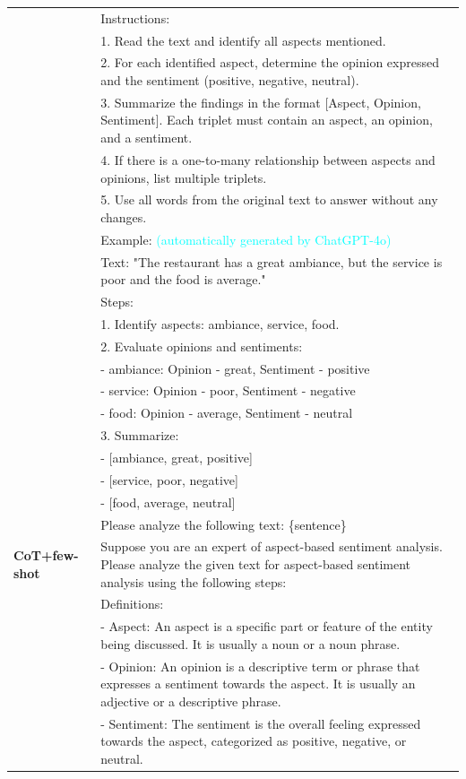\documentclass[11pt]{article}
\begin{document}
\begin{table}
{\begin{tabular}{lp{40em}}
    &Instructions:\\
    &1. Read the text and identify all aspects mentioned.\\
    &2. For each identified aspect, determine the opinion expressed and the sentiment (positive, negative, neutral).\\
    &3. Summarize the findings in the format [Aspect, Opinion, Sentiment]. Each triplet must contain an aspect, an opinion, and a sentiment.\\
    &4. If there is a one-to-many relationship between aspects and opinions, list multiple triplets.\\
    &5. Use all words from the original text to answer without any changes.\\
    
    &Example: \textcolor{cyan}{(automatically generated by ChatGPT-4o)}\\
    &Text: "The restaurant has a great ambiance, but the service is poor and the food is average."\\
    
    &Steps:\\
    &1. Identify aspects: ambiance, service, food.\\
    &2. Evaluate opinions and sentiments:\\
    &    - ambiance: Opinion - great, Sentiment - positive\\
    &    - service: Opinion - poor, Sentiment - negative\\
    &    - food: Opinion - average, Sentiment - neutral\\
    &3. Summarize:\\
    &    - [ambiance, great, positive]\\
    &    - [service, poor, negative]\\
    &    - [food, average, neutral]\\
    
    &Please analyze the following text: \{sentence\}\\
    \midrule
    \textbf{CoT+few-shot} & Suppose you are an expert of aspect-based sentiment analysis. Please analyze the given text for aspect-based sentiment analysis using the following steps:\\    
    &Definitions:\\
    &- Aspect: An aspect is a specific part or feature of the entity being discussed. It is usually a noun or a noun phrase.\\
    &- Opinion: An opinion is a descriptive term or phrase that expresses a sentiment towards the aspect. It is usually an adjective or a descriptive phrase.\\
    &- Sentiment: The sentiment is the overall feeling expressed towards the aspect, categorized as positive, negative, or neutral.\\
    

\end{tabular}}
\end{table}
\end{document}
